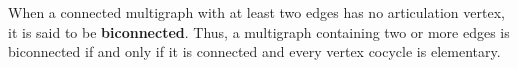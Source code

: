 When a connected multigraph with at least two edges has no articulation vertex, it is said to be \textbf{biconnected}. Thus, a multigraph containing two or more edges is biconnected if and only if it is connected and every vertex cocycle is elementary.
